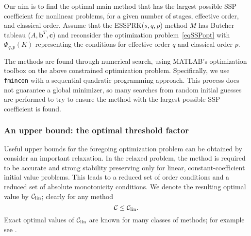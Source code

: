 Our aim is to find the optimal main method that has the largest possible
SSP coefficient for nonlinear problems, for a given number of stages, effective order,
and classical order. 
Assume that the ESSPRK($s, q, p$) method \( M \) has Butcher tableau  ($A, \bm{b}^T, \bm{c}$)
and reconsider the optimization problem~\eqref{eqSSPopt}
with \( \Phi_{q,p}(K) \) representing  the conditions for effective order $q$ and classical order $p$.

The methods are found through numerical search, using
\textsc{MATLAB}'s optimization toolbox on the above constrained
optimization problem.  Specifically, we use \verb"fmincon" with a
sequential quadratic programming approach.
This process does not guarantee a global minimizer, so many searches
from random initial guesses are performed to try to ensure the method
with the largest possible SSP coefficient is found.

\subsubsection{An upper bound: the optimal threshold factor}
Useful upper bounds for the foregoing optimization problem can be obtained
by consider an important relaxation.  In the relaxed problem, the method is
required to be accurate and strong stability preserving only for linear,
constant-coefficient initial value problems.  This leads to a reduced set of
order conditions and a reduced set of absolute monotonicity conditions.  We
denote the resulting optimal value by $\mathcal{C}_{\text{lin}}$; clearly for any method
$$\mathcal{C}\le\mathcal{C}_{\text{lin}}.$$
Exact optimal values of $\mathcal{C}_{\text{lin}}$ are known for many classes of methods; for example see
\cite{Kraaijevanger1986,ketcheson2009a}.



